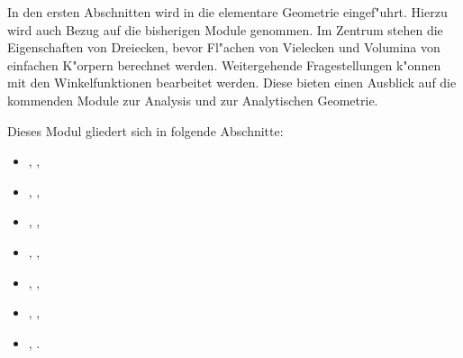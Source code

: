 

\Mtikzexternalize

\MSetSubject{\MINTMathematics}


\newcommand{\MGrad}{{}^{\circ}}


\begin{MSectionStart}

In den ersten Abschnitten wird in die elementare Geometrie eingef"uhrt. 
Hierzu wird auch Bezug auf die bisherigen Module genommen. Im Zentrum stehen 
die Eigenschaften von Dreiecken, bevor Fl"achen von Vielecken und Volumina 
von einfachen K"orpern berechnet werden.
Weitergehende Fragestellungen k"onnen mit den Winkelfunktionen bearbeitet
werden. Diese bieten einen Ausblick auf die kommenden Module zur Analysis
und zur Analytischen Geometrie.

Dieses Modul gliedert sich in folgende Abschnitte:

\begin{itemize}
\item{, ,}
\item{, ,}
\item{, ,}
\item{, ,}
\item{, ,}
\item{, ,}
\item{, .}
\end{itemize}

\end{MSectionStart}



